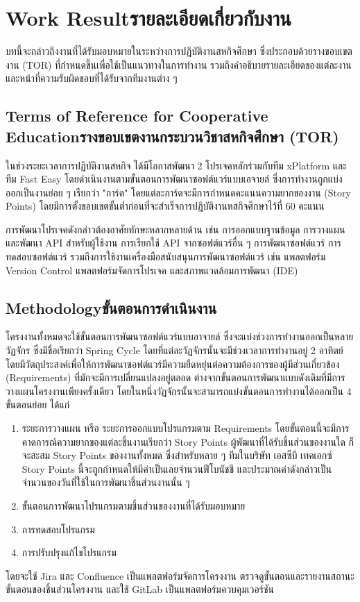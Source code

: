 \chapter{\ifenglish Work Result\else รายละเอียดเกี่ยวกับงาน\fi}
บทนี้จะกล่าวถึงงานที่ได้รับมอบหมายในระหว่างการปฏิบัติงานสหกิจศึกษา ซึ่งประกอบด้วยรางขอบเขตงาน (TOR) ที่กำหนดขึ้นเพื่อใช้เป็นแนวทางในการทำงาน รวมถึงคำอธิบายรายละเอียดของแต่ละงานและหน้าที่ความรับผิดชอบที่ได้รับจากทีมงานต่าง ๆ

\section{\ifenglish Terms of Reference for Cooperative Education\else รางขอบเขตงานกระบวนวิชาสหกิจศึกษา (TOR) \fi}
ในช่วงระยะเวลาการปฏิบัติงานสหกิจ ได้มีโอกาสพัฒนา 2 โปรเจคหลักร่วมกับทีม xPlatform และทีม Fast Easy โดยดำเนินงานตามขั้นตอนการพัฒนาซอฟต์แวร์แบบเอจายล์ ซึ่งการทำงานถูกแบ่งออกเป็นงานย่อย ๆ เรียกว่า "การ์ด" โดยแต่ละการ์ดจะมีการกำหนดคะแนนความยากของงาน (Story Points) โดยมีการตั้งขอบเขตขั้นต่ำก่อนที่จะสำเร็จการปฎิบัติงานหสกิจศึกษาไว้ที่ 60 คะแนน

การพัฒนาโปรเจคดังกล่าวต้องอาศัยทักษะหลากหลายด้าน เช่น การออกแบบฐานข้อมูล การวางแผนและพัฒนา API สำหรับผู้ใช้งาน การเรียกใช้ API จากซอฟต์แวร์อื่น ๆ การพัฒนาซอฟต์แวร์ การทดสอบซอฟต์แวร์ รวมถึงการใช้งานเครื่องมือสนับสนุนการพัฒนาซอฟต์แวร์ เช่น แพลตฟอร์ม Version Control แพลตฟอร์มจัดการโปรเจค และสภาพแวดล้อมการพัฒนา (IDE)

\section{\ifenglish Methodology\else ขั้นตอนการดำเนินงาน \fi}
โครงงานทั้งหมดจะใช้ขั้นตอนการพัฒนาซอฟต์แวร์แบบอาจายล์ ซึ่งจะแบ่งช่วงการทำงานออกเป็นหลายวัฏจักร ซึ่งมีชื่อเรียกว่า Spring Cycle โดยที่แต่ละวัฏจักรนั้นจะมีช่วงเวลาการทำงานอยู่ 2 อาทิตย์ โดยมีวัตถุประสงค์เพื่อให้การพัฒนาซอฟต์แวร์มีความยืดหยุ่นต่อความต้องการของผู้มีส่วนเกี่ยวข้อง (Requirements) ที่มักจะมีการเปลี่ยนแปลงอยู่ตลอด ต่างจากขั้นตอนการพัฒนาแบบดังเดิมที่มีการวางแผนโครงงานเพียงครั้งเดียว โดยในหนึ่งวัฏจักรนั้นจะสามารถแบ่งขั้นตอนการทำงานได้ออกเป็น 4 ขั้นตอนย่อย ได้แก่
\begin{enumerate}
    \item ระยะการวางแผน หรือ ระยะการออกแบบโปรแกรมตาม Requirements โดยขั้นตอนนี้จะมีการคาดการณ์ความยากของแต่ละชิ้นงานเรียกว่า Story Points ผู้พัฒนาที่ได้รับชิ้นส่วนของงานใด ก็จะสะสม Story Points ของงานทั้งหมด ซึ่งสำหรับหลาย ๆ ทีมในบริษัท เอสซีบี เทคเอกซ์ Story Points นี้จะถูกกำหนดให้มีค่าเป็นเลยจำนวนฟีโบนัชชี และประมาณค่าดังกล่าวเป็นจำนวนของวันที่ใช้ในการพัฒนาชิ้นส่วนงานนั้น ๆ 
    \item ขั้นตอนการพัฒนาโปรแกรมตามชิ้นส่วนของงานที่ได้รับมอบหมาย
    \item การทดสอบโปรแกรม
    \item การปรับปรุงแก้ไขโปรแกรม
\end{enumerate}
โดยจะใช้ Jira และ Confluence เป็นแพลตฟอร์มจัดการโครงงาน ตรวจดูขั้นตอนและรายงานสถานะขั้นตอนของชิ้นส่วนโครงงาน และใช้ GitLab เป็นแพลตฟอร์มควบคุมเวอร์ชัน

